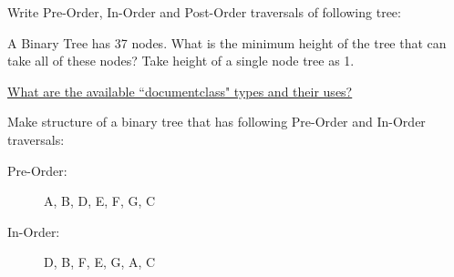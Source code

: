 \documentclass[11pt]{exam}
\begin{document}
\newpage %

%

\begin{questions}


\addpoints
\question[3] Write Pre-Order, In-Order and Post-Order traversals of following tree:
\begin{center}
\end{center}
\vspace{4in}

\addpoints
\question[2] A Binary Tree has 37 nodes. What is the minimum height of the tree that can take all of these nodes? Take height of a single node tree as 1.
\vspace{3in}

	\href{https://tex.stackexchange.com/questions/782/what-are-the-available-documentclass-types-and-their-uses}{{What are the available ``documentclass" types and their uses?}}

\addpoints
\question[3] Make structure of a binary tree that has following Pre-Order and In-Order traversals:
\begin{description}
\item[Pre-Order:] A, B, D, E, F, G, C
\item[In-Order:] D, B, F, E, G, A, C
\end{description}
\vspace{6in}


\end{questions}
\end{document}
